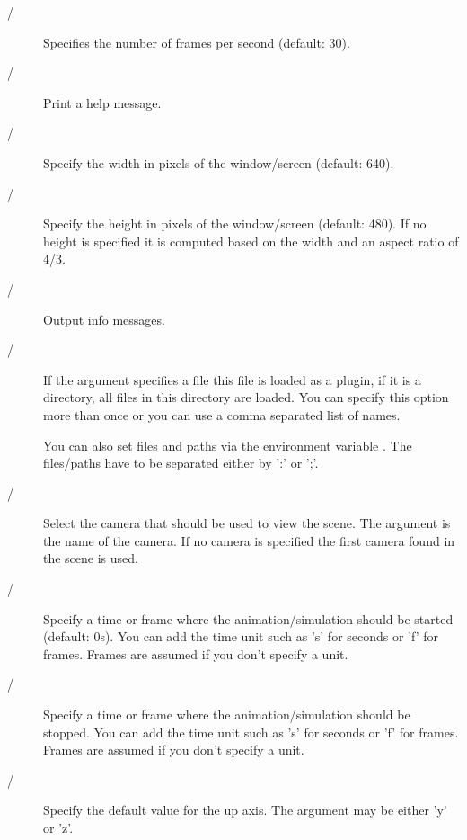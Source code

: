 \begin{description}
\item[ / ] 
Specifies the number of frames per second (default: 30).

\item[ / ]
Print a help message.

\item[ / ]
Specify the width in pixels of the window/screen (default: 640).

\item[ / ]
Specify the height in pixels of the window/screen (default: 480). If
no height is specified it is computed based on the width and an aspect
ratio of 4/3.

\item[ / ]
Output info messages.

\item[ / ]
If the argument specifies a file this file is loaded as a plugin, if it
is a directory, all files in this directory are loaded. You can specify
this option more than once or you can use a comma separated list of names.

You can also set files and paths via the environment variable
. The files/paths have to be separated either
by ':' or ';'.

\item[ / ]
Select the camera that should be used to view the scene. The argument
is the name of the camera. If no camera is specified the first camera
found in the scene is used.

\item[ / ]
Specify a time or frame where the animation/simulation should be started
(default: 0s). You can add the time unit such as 's' for seconds or 'f'
for frames. Frames are assumed if you don't specify a unit.

\item[ / ]
Specify a time or frame where the animation/simulation should be stopped.
You can add the time unit such as 's' for seconds or 'f' for frames. 
Frames are assumed if you don't specify a unit.

\item[ / ]
Specify the default value for the up axis. The argument may be either
'y' or 'z'.


\end{description}
